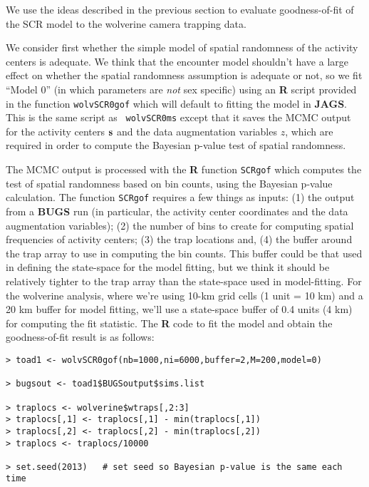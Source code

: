 {We use the ideas described in the previous section to evaluate
goodness-of-fit of the SCR model to the wolverine camera trapping data.


We consider first whether the simple model of spatial randomness of
the activity centers is adequate.  We think that the
 encounter model shouldn't have a large  effect on
whether the spatial randomness assumption is adequate or not, so we
fit ``Model 0'' (in which parameters are {\it not} sex specific)
using an {\bf R} script provided
in the function \mbox{\tt wolvSCR0gof} which will default to fitting
the model in {\bf JAGS}.  This is the same script as \mbox{\tt
  wolvSCR0ms} except that it saves the MCMC output for the activity
centers ${\bf s}$ and the data augmentation variables $z$, which are
required in order to compute the Bayesian p-value test of spatial randomness.

The MCMC output is processed with  the {\bf R} function
\mbox{\tt SCRgof} which
computes the test of spatial randomness based on bin counts, using the 
Bayesian p-value calculation. The function \mbox{\tt SCRgof} requires
 a few things as inputs: (1) the output from a
{\bf BUGS} run (in particular, the activity center coordinates and the
data augmentation variables); (2) the number of bins to create for
computing spatial frequencies of activity centers;  (3) the trap
locations and, (4) the buffer
around the trap array to use in computing the bin counts.  This buffer could be that used
in defining the state-space for the model fitting, but we think it should be
relatively tighter to the trap array than the state-space used in
model-fitting. For the wolverine analysis,  where we're using 10-km grid cells
(1 unit = 10 km) and a 20 km buffer for model fitting, we'll use a
state-space buffer of  0.4 units (4 km) for
computing the fit statistic.
The {\bf R} code to fit the model and obtain the goodness-of-fit
result is as follows:
{\small
\begin{verbatim}
> toad1 <- wolvSCR0gof(nb=1000,ni=6000,buffer=2,M=200,model=0)

> bugsout <- toad1$BUGSoutput$sims.list

> traplocs <- wolverine$wtraps[,2:3]
> traplocs[,1] <- traplocs[,1] - min(traplocs[,1])
> traplocs[,2] <- traplocs[,2] - min(traplocs[,2])
> traplocs <- traplocs/10000

> set.seed(2013)   # set seed so Bayesian p-value is the same each time


\end{verbatim}}}
